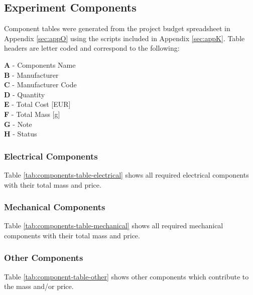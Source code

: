 \begin{landscape}
\subsection{Experiment Components} \label{components}
\label{sec:experiment-components}

Component tables were generated from the project budget spreadsheet in Appendix \ref{sec:appO} using the scripts included in Appendix \ref{sec:appK}. Table headers are letter coded and correspond to the following:

\textbf{A} - Components Name\\
\textbf{B} - Manufacturer\\
\textbf{C} - Manufacturer Code\\
\textbf{D} - Quantity\\
\textbf{E} - Total Cost [EUR]\\
\textbf{F} - Total Mass [g]\\
\textbf{G} - Note\\
\textbf{H} - Status\\

\subsubsection{Electrical Components}

Table \ref{tab:components-table-electrical} shows all required electrical components with their total mass and price.\\



\end{landscape}

\begin{landscape}

\subsubsection{Mechanical Components}

Table \ref{tab:components-table-mechanical} shows all required mechanical components with their total mass and price.\\




\raggedbottom
\end{landscape}

\begin{landscape}
\subsubsection{Other Components}
Table \ref{tab:component-table-other} shows other components which contribute to the mass and/or price.\\




\raggedbottom
\end{landscape}